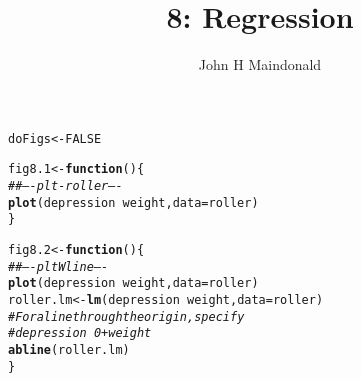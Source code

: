 \documentclass[12pt, a4paper,  BCOR=8.25mm, DIV=15]{scrartcl}\usepackage[]{graphicx}\usepackage[]{color}
\makeatletter
\newcommand{\hlnum}[1]{\textcolor[rgb]{0.686,0.059,0.569}{#1}}%
\newcommand{\hlcom}[1]{\textcolor[rgb]{0.678,0.584,0.686}{\textit{#1}}}%
\newcommand{\hlopt}[1]{\textcolor[rgb]{0,0,0}{#1}}%
\newcommand{\hlstd}[1]{\textcolor[rgb]{0.345,0.345,0.345}{#1}}%
\newcommand{\hlkwa}[1]{\textcolor[rgb]{0.161,0.373,0.58}{\textbf{#1}}}%
\newcommand{\hlkwb}[1]{\textcolor[rgb]{0.69,0.353,0.396}{#1}}%
\newcommand{\hlkwc}[1]{\textcolor[rgb]{0.333,0.667,0.333}{#1}}%
\newcommand{\hlkwd}[1]{\textcolor[rgb]{0.737,0.353,0.396}{\textbf{#1}}}%
\newenvironment{kframe}{%
 \def\at@end@of@kframe{}%
 \ifinner\ifhmode%
  \def\at@end@of@kframe{\end{minipage}}%
  \begin{minipage}{\columnwidth}%
 \fi\fi%
 \def\FrameCommand##1{\hskip\@totalleftmargin \hskip-\fboxsep
 \colorbox{shadecolor}{##1}\hskip-\fboxsep
     \hskip-\linewidth \hskip-\@totalleftmargin \hskip\columnwidth}%
 \MakeFramed {\advance\hsize-\width
   \@totalleftmargin\z@ \linewidth\hsize
   \@setminipage}}%
 {\par\unskip\endMakeFramed%
 \at@end@of@kframe}
\newenvironment{knitrout}{}{} %
\makeatother
\begin{document}




\title{8: Regression}
\author{John H Maindonald}
\maketitle

\begin{knitrout}
\color{fgcolor}\begin{kframe}
\begin{alltt}
\hlstd{doFigs} \hlkwb{<-} \hlnum{FALSE}
\end{alltt}
\end{kframe}
\end{knitrout}

\vspace*{-1cm}

\begin{knitrout}
\color{fgcolor}\begin{kframe}
\begin{alltt}
\hlstd{fig8.1} \hlkwb{<-} \hlkwa{function}\hlstd{()\{}
\hlcom{## ---- plt-roller ----}
\hlkwd{plot}\hlstd{(depression} \hlopt{~} \hlstd{weight,} \hlkwc{data}\hlstd{=roller)}
\hlstd{\}}
\end{alltt}
\end{kframe}
\end{knitrout}

\begin{knitrout}
\color{fgcolor}\begin{kframe}
\begin{alltt}
\hlstd{fig8.2} \hlkwb{<-} \hlkwa{function}\hlstd{()\{}
\hlcom{## ---- pltWline ----}
\hlkwd{plot}\hlstd{(depression} \hlopt{~} \hlstd{weight,} \hlkwc{data}\hlstd{=roller)}
\hlstd{roller.lm} \hlkwb{<-} \hlkwd{lm}\hlstd{(depression} \hlopt{~} \hlstd{weight,} \hlkwc{data}\hlstd{=roller)}
\hlcom{# For a line through the origin, specify}
\hlcom{# depression ~ 0 + weight}
\hlkwd{abline}\hlstd{(roller.lm)}
\hlstd{\}}
\end{alltt}
\end{kframe}
\end{knitrout}
\end{document}
